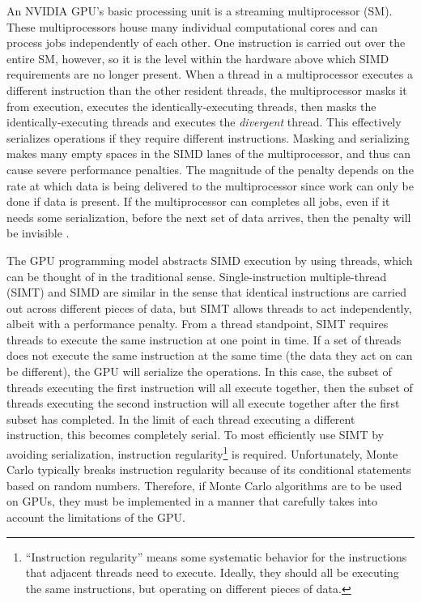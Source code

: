 \documentclass[preprint,12pt]{elsarticle}
\begin{document}
An NVIDIA GPU's basic processing unit is a streaming multiprocessor (SM).  These multiprocessors house many individual computational cores and can process jobs independently of each other.  One instruction is carried out over the entire SM, however, so it is the level within the hardware above which SIMD requirements are no longer present.  When a thread in a multiprocessor executes a different instruction than the other resident threads, the multiprocessor masks it from execution, executes the identically-executing threads, then masks the identically-executing threads and executes the \emph{divergent} thread.  This effectively serializes operations if they require different instructions.  Masking and serializing makes many empty spaces in the SIMD lanes of the multiprocessor, and thus can cause severe performance penalties.  The magnitude of the penalty depends on the rate at which data is being delivered to the multiprocessor since work can only be done if data is present.  If the multiprocessor can completes all jobs, even if it needs some serialization, before the next set of data arrives, then the penalty will be invisible \cite{cuda}.

The GPU programming model abstracts SIMD execution by using threads, which can be thought of in the traditional sense. Single-instruction multiple-thread (SIMT) and SIMD are similar in the sense that identical instructions are carried out across different pieces of data, but SIMT allows threads to act independently, albeit with a performance penalty.  From a thread standpoint, SIMT requires threads to execute the same instruction at one point in time.  If a set of threads does not execute the same instruction at the same time (the data they act on can be different), the GPU will serialize the operations.  In this case, the subset of threads executing the first instruction will all execute together, then the subset of threads executing the second instruction will all execute together after the first subset has completed. In the limit of each thread executing a different instruction, this becomes completely serial.  To most efficiently use SIMT by avoiding serialization, instruction regularity\footnote{``Instruction regularity'' means some systematic behavior for the instructions that adjacent threads need to execute.  Ideally, they should all be executing the same instructions, but operating on different pieces of data.} is required. Unfortunately, Monte Carlo typically breaks instruction regularity because of its conditional statements based on random numbers.  Therefore, if Monte Carlo algorithms are to be used on GPUs, they must be implemented in a manner that carefully takes into account the limitations of the GPU.
\end{document}
